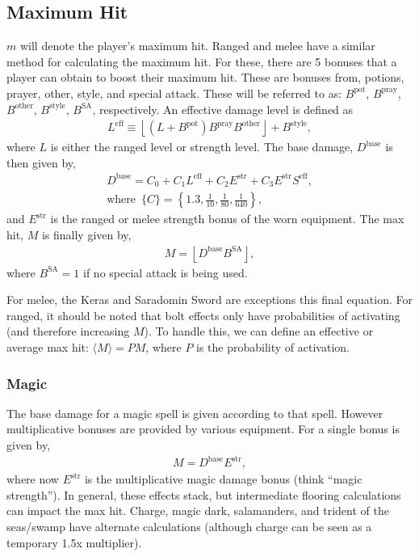 \documentclass[../../main.tex]{subfiles}
\begin{document}
		\subsection{Maximum Hit}
			$m$ will denote the player's maximum hit. Ranged and melee have a similar method for calculating the maximum hit. For these, there are 5 bonuses that a player can obtain to boost their maximum hit. These are bonuses from, potions, prayer, other, style, and special attack. These will be referred to as: $B^\text{pot}$, $B^\text{pray}$, $B^\text{other}$, $B^\text{style}$, $B^\text{SA}$, respectively. An effective damage level is defined as
			\begin{align}
				L^\text{eff} \equiv \left \lfloor \left(L + B^\text{pot} \right)B^\text{pray}B^\text{other} \right \rfloor + B^\text{style},
			\end{align}
			where $L$ is either the ranged level or strength level. The base damage, $D^\text{base}$ is then given by,
			\begin{align}
				D^\text{base} = C_0 + C_1L^\text{eff} + C_2 E^\text{str} + C_3 E^\text{str}S^\text{eff},\\
				\text{where}\,\,\, \{C\} = \left\{1.3, \frac{1}{10}, \frac{1}{80}, \frac{1}{640}\right\},
			\end{align}
			and $E^\text{str}$ is the ranged or melee strength bonus of the worn equipment. The max hit, $M$ is finally given by,
			\begin{align}
				M = \left \lfloor D^\text{base} B^\text{SA}\right \rfloor,
			\end{align}
			where $B^\text{SA} = 1$ if no special attack is being used.

 			For melee, the Keras and Saradomin Sword are exceptions this final equation. For ranged, it should be noted that bolt effects only have probabilities of activating (and therefore increasing $M$). To handle this, we can define an effective or average max hit: $\langle M \rangle = P M$, where $P$ is the probability of activation.
			\subsubsection{Magic}
				The base damage for a magic spell is given according to that spell. However multiplicative bonuses are provided by various equipment. For a single bonus is given by,
				\begin{align}
					M = D^\text{base}E^\text{str},
				\end{align}
				where now $E^\text{str}$ is the multiplicative magic damage bonus (think ``magic\\strength''). In general, these effects stack, but intermediate flooring calculations can impact the max hit. Charge, magic dark, salamanders, and trident of the seas/swamp have alternate calculations (although charge can be seen as a temporary 1.5x multiplier).
\end{document}
